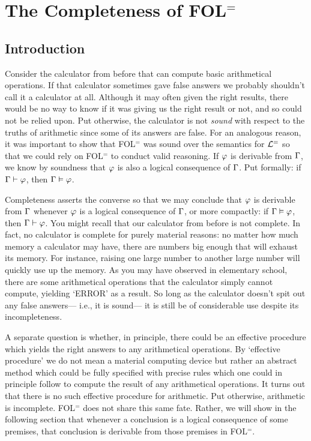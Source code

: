 ﻿%
\chapter{The Completeness of FOL$^=$}
\label{ch.FOL-completeness}

\section{Introduction}
  \label{sec:Introduction}

Consider the calculator from before that can compute basic arithmetical operations.
If that calculator sometimes gave false answers we probably shouldn't call it a calculator at all.
Although it may often given the right results, there would be no way to know if it was giving us the right result or not, and so could not be relied upon.
Put otherwise, the calculator is not \textit{sound} with respect to the truths of arithmetic since some of its answers are false.
For an analogous reason, it was important to show that FOL$^=$ was sound over the semantics for $\mathcal{L}^{=}$ so that we could rely on FOL$^=$ to conduct valid reasoning.
If $\varphi$ is derivable from $\Gamma$, we know by soundness that $\varphi$ is also a logical consequence of $\Gamma$.
Put formally: if $\Gamma\vdash\varphi$, then $\Gamma\vDash\varphi$.

Completeness asserts the converse so that we may conclude that $\varphi$ is derivable from $\Gamma$ whenever $\varphi$ is a logical consequence of $\Gamma$, or more compactly: if $\Gamma\vDash\varphi$, then $\Gamma\vdash\varphi$.
You might recall that our calculator from before is not complete.
In fact, no calculator is complete for purely material reasons: no matter how much memory a calculator may have, there are numbers big enough that will exhaust its memory.
For instance, raising one large number to another large number will quickly use up the memory.
As you may have observed in elementary school, there are some arithmetical operations that the calculator simply cannot compute, yielding `ERROR' as a result.
So long as the calculator doesn't spit out any false answers--- i.e., it is sound--- it is still be of considerable use despite its incompleteness.

A separate question is whether, in principle, there could be an effective procedure which yields the right answers to any arithmetical operations.
By `effective procedure' we do not mean a material computing device but rather an abstract method which could be fully specified with precise rules which one could in principle follow to compute the result of any arithmetical operations.
It turns out that there is no such effective procedure for arithmetic.
Put otherwise, arithmetic is incomplete.
FOL$^=$ does not share this same fate.
Rather, we will show in the following section that whenever a conclusion is a logical consequence of some premises, that conclusion is derivable from those premises in FOL$^=$.

